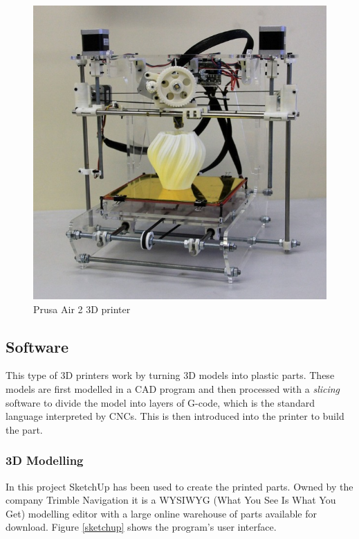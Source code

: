 		\begin{figure}[H]
				\centering
				\includegraphics[scale=0.4]{images/ProjectComponents/tia.jpg}
				\caption{Prusa Air 2 3D printer}
				\label{tia}
			\end{figure}
			\bigskip














\subsection{Software}
	This type of 3D printers work by turning 3D models into plastic parts. These models are first modelled in a CAD program and then processed with a \textit{slicing} software to divide the model into layers of G-code, which is the standard language interpreted by CNCs. This is then introduced into the printer to build the part.

		\subsubsection{3D Modelling }
		In this project SketchUp has been used to create the printed parts. Owned by the company Trimble Navigation it is a WYSIWYG (What You See Is What You Get) modelling editor with a large online warehouse of parts available for download. Figure \ref{sketchup} shows the program's user interface.\\

